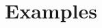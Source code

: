 \documentclass{article}
\theoremstyle{plain}
\theoremstyle{definition}
\theoremstyle{plain}
\theoremstyle{plain}
\theoremstyle{plain}
\theoremstyle{remark}
\theoremstyle{remark}
\theoremstyle{plain}
\theoremstyle{plain}
\begin{document}
%	
%
%	
%

\section{Examples}\label{sec:examples}
\end{document}
